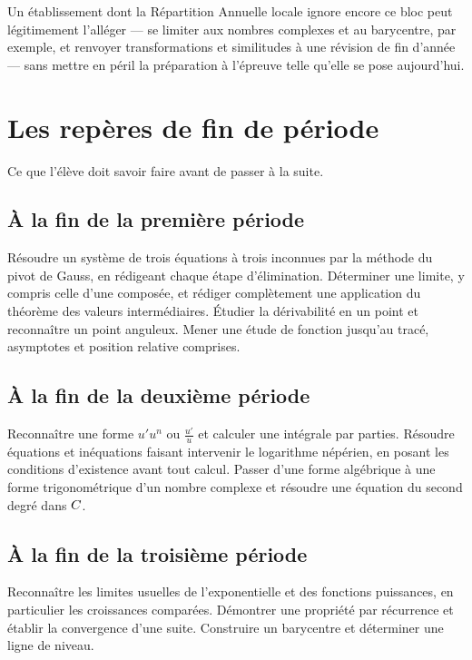 Un établissement dont la Répartition Annuelle locale ignore encore ce bloc
peut légitimement l'alléger — se limiter aux nombres complexes et au
barycentre, par exemple, et renvoyer transformations et similitudes à une
révision de fin d'année — sans mettre en péril la préparation à l'épreuve
telle qu'elle se pose aujourd'hui.

\section*{Les repères de fin de période}

Ce que l'élève doit savoir faire avant de passer à la suite.

\subsection*{À la fin de la première période}

Résoudre un système de trois équations à trois inconnues par la méthode du
pivot de Gauss, en rédigeant chaque étape d'élimination. Déterminer une
limite, y compris celle d'une composée, et rédiger complètement une
application du théorème des valeurs intermédiaires. Étudier la dérivabilité
en un point et reconnaître un point anguleux. Mener une étude de fonction
jusqu'au tracé, asymptotes et position relative comprises.

\subsection*{À la fin de la deuxième période}

Reconnaître une forme $u'u^{n}$ ou $\frac{u'}{u}$ et calculer une intégrale
par parties. Résoudre équations et inéquations faisant intervenir le
logarithme népérien, en posant les conditions d'existence avant tout calcul.
Passer d'une forme algébrique à une forme trigonométrique d'un nombre
complexe et résoudre une équation du second degré dans $C$.

\subsection*{À la fin de la troisième période}

Reconnaître les limites usuelles de l'exponentielle et des fonctions
puissances, en particulier les croissances comparées. Démontrer une
propriété par récurrence et établir la convergence d'une suite. Construire
un barycentre et déterminer une ligne de niveau.

